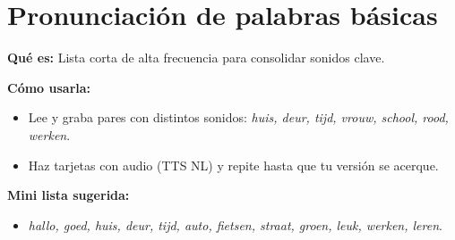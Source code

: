 \section{Pronunciación de palabras básicas}
\textbf{Qué es:} Lista corta de alta frecuencia para consolidar sonidos clave.

\textbf{Cómo usarla:}
\begin{itemize}[leftmargin=*]
  \item Lee y graba pares con distintos sonidos: \textit{huis, deur, tijd, vrouw, school, rood, werken}.
  \item Haz tarjetas con audio (TTS NL) y repite hasta que tu versión se acerque.
\end{itemize}

\textbf{Mini lista sugerida:}
\begin{itemize}[leftmargin=*]
  \item \textit{hallo, goed, huis, deur, tijd, auto, fietsen, straat, groen, leuk, werken, leren}.
\end{itemize}
